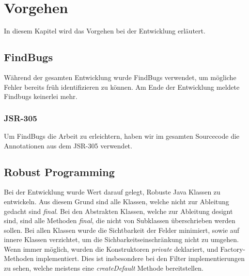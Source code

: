 \section{Vorgehen}

In diesem Kapitel wird das Vorgehen bei der Entwicklung erläutert.

\subsection{FindBugs}

Während der gesamten Entwicklung wurde FindBugs verwendet, um mögliche Fehler bereits 
früh identifizieren zu können. Am Ende der Entwicklung meldete Findbugs keinerlei mehr.

\subsubsection{JSR-305}

Um FindBugs die Arbeit zu erleichtern, haben wir im gesamten Sourcecode die Annotationen aus dem JSR-305 
verwendet.

\subsection{Robust Programming}

Bei der Entwicklung wurde Wert darauf gelegt, Robuste Java Klassen zu entwickeln. Aus diesem Grund 
sind alle Klassen, welche nicht zur Ableitung gedacht sind \textit{final}. Bei den Abstrakten Klassen,
welche zur Ableitung designt sind, sind alle Methoden \textit{final}, die nicht von Subklassen überschrieben
werden sollen. Bei allen Klassen wurde die Sichtbarkeit der Felder minimiert, sowie auf innere Klassen 
verzichtet, um die Sichbarkeitseinschränkung nicht zu umgehen. Wenn immer möglich, wurden die 
Konstruktoren \textit{private} deklariert, und Factory-Methoden implementiert. Dies ist insbesondere
bei den Filter implementierungen zu sehen, welche meistens eine \textit{createDefault} Methode 
bereitstellen.
